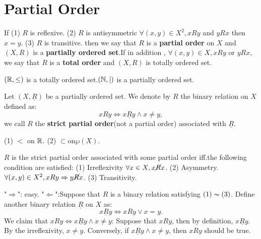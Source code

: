 \documentclass{book}
\numberwithin{equation}{section}
\begin{document}
\section{Partial Order}
\begin{definitionenv}
    If 
    \newline
    (1) $R$ is reflexive.
    \newline
    (2) $R$ is antisymmetric $\forall (x, y)\in X^2, xRy $ and $yRx$ then $x=y$.
    \newline
    (3) $R$ is transitive.
    \newline
    then we say that $R$ is a \textbf{partial order} on $X$ and $(X, R) $ is a \textbf{partially ordered set}.If in addition , $\forall (x, y)\in X , xRy$ or $yRx$,  we say that $R$ is a \textbf{total order} and $(X, R)$ is totally ordered set. 
\end{definitionenv}
\begin{exampleenv}
    $(\mathbb{R} , \le)$ is a totally ordered set.$(\mathbb{N} , |)$ is a partially ordered set.  
\end{exampleenv}
\begin{definitionenv}
    Let $(X, \underline{R})$ be a partially ordered set. We denote by $R$ the binary relation on $X$ defined as:$$xRy \Leftrightarrow x\underline{R}y \wedge x\not=y, $$ we call $R$ the \textbf{strict partial order}(not a partial order) associated with $\underline{R}$.
\end{definitionenv}
\begin{exampleenv}
    \quad
    \newline
    (1) $<$ on $\mathbb{R}$.
    \newline
    (2) $\subset $on$ \wp (X)$.
\end{exampleenv}
\begin{propositionenv}
    $R$ is the strict partial order associated with some partial order iff.the following condition are satisfied:
    \newline
    (1) Irreflexivity $\forall x\in X, x \cancel{R}x$.
    \newline
    (2) Asymmetry.$\forall (x, y)\in X^2, xRy\Rightarrow y\cancel{R}x$.
    \newline
    (3) Transitivity.
\end{propositionenv}
\begin{proofenv}
    "$\Rightarrow$": easy.
    \newline
    "$\Leftarrow$":Suppose that $R$ is a binary relation satisfying $(1)\thicksim(3)$. Define another binary relation $\underline{R}$ on $X$ as:
    $$x\underline{R}y\Leftrightarrow xRy \vee x=y.$$
    We claim that $xRy\Leftrightarrow x\underline{R}y \wedge x\not= y$:
    \newline
    Suppose that $xRy$,  then by definition,  $x\underline{R}y$. By the irreflexivity,  $x\not=y$.
    \newline
    Conversely,  if $x\underline{R}y\wedge x\not=y$, then $xRy$ should be true.
\end{proofenv}
\end{document}
